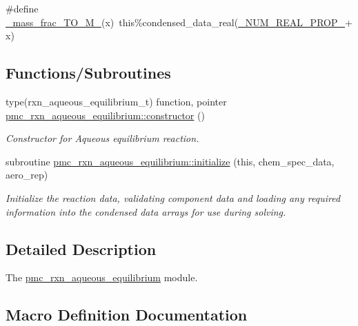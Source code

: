 \begin{DoxyCompactItemize}
\item 
\#define \mbox{\hyperlink{rxn__aqueous__equilibrium_8_f90_a3a3cc7f93cf5faf0c97c8da64796159c}{\+\_\+mass\+\_\+frac\+\_\+\+T\+O\+\_\+\+M\+\_\+}}(x)~this\%condensed\+\_\+data\+\_\+real(\mbox{\hyperlink{sub__model___u_n_i_f_a_c_8_f90_a242fac7fe42c0d62936c65735dc023a6}{\+\_\+\+N\+U\+M\+\_\+\+R\+E\+A\+L\+\_\+\+P\+R\+O\+P\+\_\+}}+x)
\end{DoxyCompactItemize}
\subsection*{Functions/\+Subroutines}
\begin{DoxyCompactItemize}
\item 
type(rxn\+\_\+aqueous\+\_\+equilibrium\+\_\+t) function, pointer \mbox{\hyperlink{namespacepmc__rxn__aqueous__equilibrium_ae6c5b3259b8d34ae01cf59fb68e950a2}{pmc\+\_\+rxn\+\_\+aqueous\+\_\+equilibrium\+::constructor}} ()
\begin{DoxyCompactList}\small\item\em Constructor for Aqueous equilibrium reaction. \end{DoxyCompactList}\item 
subroutine \mbox{\hyperlink{namespacepmc__rxn__aqueous__equilibrium_a1563a3411636e56a81e0915d45085e45}{pmc\+\_\+rxn\+\_\+aqueous\+\_\+equilibrium\+::initialize}} (this, chem\+\_\+spec\+\_\+data, aero\+\_\+rep)
\begin{DoxyCompactList}\small\item\em Initialize the reaction data, validating component data and loading any required information into the condensed data arrays for use during solving. \end{DoxyCompactList}\end{DoxyCompactItemize}


\subsection{Detailed Description}
The \mbox{\hyperlink{namespacepmc__rxn__aqueous__equilibrium}{pmc\+\_\+rxn\+\_\+aqueous\+\_\+equilibrium}} module. 



\subsection{Macro Definition Documentation}
\mbox{\label{rxn__aqueous__equilibrium_8_f90_a09731b4569901a5008e219da69e920ae}} 
